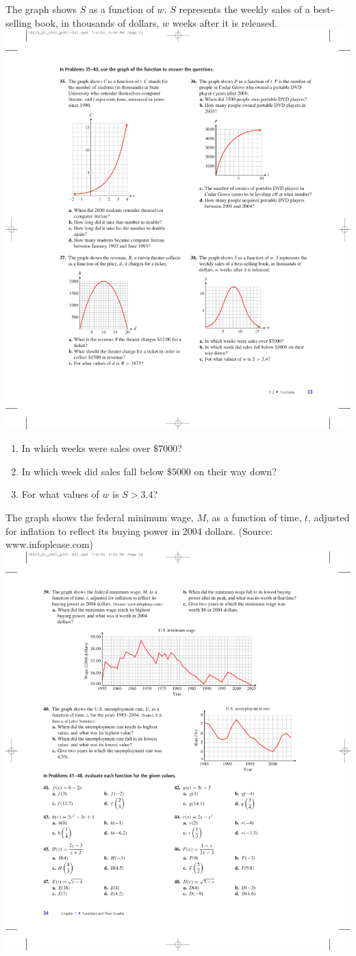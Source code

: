 \documentclass[10pt,]{book}
\theoremstyle{plain}
\theoremstyle{definition}
\theoremstyle{definition}
\theoremstyle{definition}
\theoremstyle{definition}
\numberwithin{equation}{part}
\newcommand{\gt}{>}
\begin{document}
\begin{exerciselist}
\begin{exercisegroup}
\begin{enumerate}[label=\alph*]
\end{enumerate}
%
\exercise[38.]\hypertarget{exercise-107}{}The graph shows \(S\) as a function of \(w\). \(S\) represents the weekly sales of a best-selling book, in thousands of dollars, \(w\) weeks after it is released.%
\includegraphics[width=0.5\linewidth]{images/fig-ex-1-2-38}
\leavevmode%
\begin{enumerate}[label=\alph*]
\item\hypertarget{li-393}{}In which weeks were sales over \(\$7000\)?%
\item\hypertarget{li-394}{}In which week did sales fall below \(\$5000\) on their way down?%
\item\hypertarget{li-395}{}For what values of \(w\) is \(S\gt 3.4\)?%
\end{enumerate}
\exercise[39.]\hypertarget{exercise-108}{}The graph shows the federal minimum wage, \(M\), as a function of time, \(t\), adjusted for inflation to reflect its buying power in 2004 dollars. (Source: www.infoplease.com) \includegraphics[width=1\linewidth]{images/fig-ex-1-2-39}

\end{exercisegroup}
\end{exerciselist}
\end{document}
